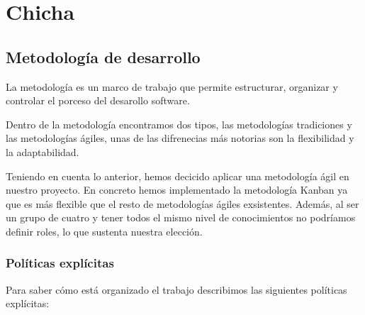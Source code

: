 \chapter{Chicha}
\label{cap:chicha}

\section{Metodología de desarrollo}
La metodología es un marco de trabajo que permite estructurar, organizar y controlar el porceso del desarollo software.

Dentro de la metodología encontramos dos tipos, las metodologías tradiciones y las metodologías ágiles, unas de las difrenecias más notorias son la flexibilidad y la adaptabilidad. 

Teniendo en cuenta lo anterior, hemos decicido aplicar una metodología ágil en nuestro proyecto. En concreto hemos implementado la metodología Kanban ya que es más flexible que el resto de metodologías ágiles exsistentes. Además, al ser un grupo de cuatro y tener todos el mismo nivel de conocimientos no podríamos definir roles, lo que sustenta nuestra elección.
\subsection{Políticas explícitas}
Para saber cómo está organizado el trabajo describimos las siguientes políticas explícitas:

